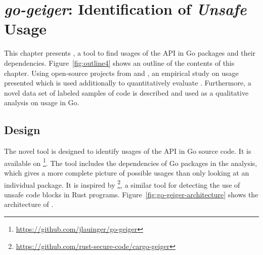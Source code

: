 
\chapter{\textit{go-geiger}: Identification of \textit{Unsafe} Usage}\label{ch:go-geiger}

This chapter presents \toolGeiger{}, a tool to find usages of the \unsafe{} \acrshort{API} in Go packages and their
dependencies.
Figure~\ref{fig:outline4} shows an outline of the contents of this chapter.
Using open-source projects from \github{} and \toolGeiger{}, an empirical study on \unsafe{} usage presented which is
used additionally to quantitatively evaluate \toolGeiger{}.
Furthermore, a novel data set of labeled samples of \unsafe{} code is described and used as a qualitative analysis on
\unsafe{} usage in Go.





\section{Design}\label{sec:go-geiger:design}

The novel tool \toolGeiger{} is designed to identify usages of the \unsafe{} \acrshort{API} in Go source code.
It is available on \github{}\footnote{\url{https://github.com/jlauinger/go-geiger}}.
The tool includes the dependencies of Go packages in the analysis, which gives a more complete picture of possible
\unsafe{} usages than only looking at an individual package.
It is inspired by \toolCargoGeiger{}\footnote{\url{https://github.com/rust-secure-code/cargo-geiger}}, a similar tool
for detecting the use of unsafe code blocks in Rust programs.
Figure~\ref{fig:go-geiger-architecture} shows the architecture of \toolGeiger{}.



